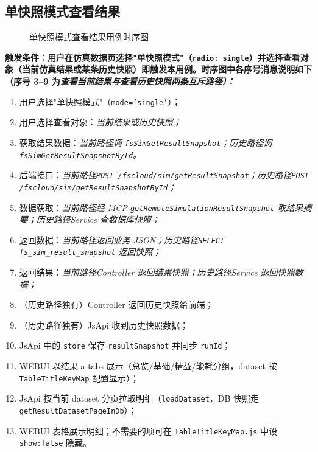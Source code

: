 \subsection{单快照模式查看结果}\label{sec:singleSnapshotView}
\begin{figure}[!h]
	\centering
	\resizebox{1.0\linewidth}{!}{}
	\caption{单快照模式查看结果用例时序图}\label{fig:singleModeView}
\end{figure}
\bf{触发条件}：用户在仿真数据页选择"单快照模式"（\texttt{radio: single}）并选择查看对象（当前仿真结果或某条历史快照）即触发本用例。时序图中各序号消息说明如下（序号 3--9 为\it{查看当前结果}与\it{查看历史快照}两条互斥路径）：
\begin{enumerate}[label=\arabic*)]
	\item 用户选择"单快照模式"（\texttt{mode='single'}）；
	\item 用户选择查看对象：\it{当前结果}或\it{历史快照}；
	\item 获取结果数据：\it{当前路径}调 \texttt{fsSimGetResultSnapshot}；\it{历史路径}调 \texttt{fsSimGetResultSnapshotById}。
	\item 后端接口：\it{当前路径}\texttt{POST /fscloud/sim/getResultSnapshot}；\it{历史路径}\texttt{POST /fscloud/sim/getResultSnapshotById}；
	\item 数据获取：\it{当前路径}经 MCP \texttt{getRemoteSimulationResultSnapshot} 取结果摘要；\it{历史路径}Service 查数据库快照；
	\item 返回数据：\it{当前路径}返回业务 JSON；\it{历史路径}\texttt{SELECT fs\_sim\_result\_snapshot} 返回快照；
	\item 返回结果：\it{当前路径}Controller 返回结果快照；\it{历史路径}Service 返回快照数据；
	\item（历史路径独有）Controller 返回历史快照给前端；
	\item（历史路径独有）JsApi 收到历史快照数据；
	\item JsApi 中的 \texttt{store} 保存 \texttt{resultSnapshot} 并同步 \texttt{runId}；
	\item WEBUI 以结果 a-tabs 展示（总览/基础/精益/能耗分组，dataset 按 \texttt{TableTitleKeyMap} 配置显示）；
	\item JsApi 按当前 dataset 分页拉取明细（\texttt{loadDataset}，DB 快照走 \texttt{getResultDatasetPageInDb}）；
	\item WEBUI 表格展示明细；不需要的项可在 \texttt{TableTitleKeyMap.js} 中设 \texttt{show:false} 隐藏。
\end{enumerate}
\newpage
